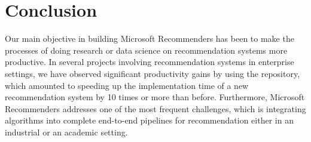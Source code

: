 \section{Conclusion}

Our main objective in building Microsoft Recommenders has been to make the processes of 
doing research or data science on recommendation systems more productive.
In several projects involving recommendation systems in enterprise settings, we have observed significant productivity gains by using the repository,
which amounted to speeding up the implementation time of a new recommendation 
system by 10 times or more than before.
Furthermore, Microsoft Recommenders addresses one of the most frequent challenges, which is integrating
algorithms into complete end-to-end pipelines for recommendation either in an industrial or 
an academic setting.